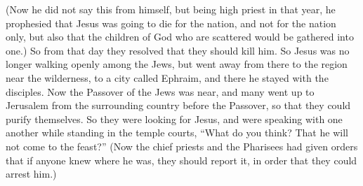 \begin{biblechapter}
\verse (Now he did not say this from himself, but being high priest in that year, he prophesied that Jesus was going to die for the nation,
\verse and not for the nation only, but also that the children of God who are scattered would be gathered into one.)
\verse So from that day they resolved that they should kill him.
\verse So Jesus was no longer walking openly among the Jews, but went away from there to the region near the wilderness, to a city called Ephraim, and there he stayed with the disciples.
\verse Now the Passover of the Jews was near, and many went up to Jerusalem from the surrounding country before the Passover, so that they could purify themselves.
\verse So they were looking for Jesus, and were speaking with one another while standing in the temple courts, “What do you think? That he will not come to the feast?”
\verse (Now the chief priests and the Pharisees had given orders that if anyone knew where he was, they should report it, in order that they could arrest him.)
\end{biblechapter}

